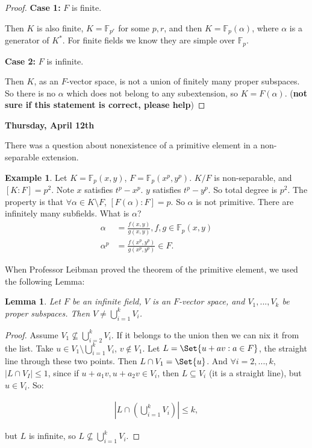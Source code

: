 \documentclass[9pt,reqno,twoside]{amsbook}
\theoremstyle{plain}
\numberwithin{section}{chapter}
\numberwithin{equation}{chapter}
\newtheorem{lem}[theorem]{Lemma}
\theoremstyle{definition}
\newtheorem{Ex}[theorem]{Example}
\theoremstyle{remark}
\theoremstyle{plain}
\newcommand{\sub}{\subseteq}
\newcommand{\F}{\mathbb{F}}
\newcommand{\bb}{\vspace{3mm}}
\newcommand{\bee}{\begin{equation}\begin{aligned}}
\newcommand{\eee}{\end{aligned}\end{equation}}
\newcommand{\fracc}{\frac}
\newcommand{\lpar}{\left(}
\newcommand{\rpar}{\right)}
\renewcommand{\leq}{\leqslant}
\begin{document}
 \begin{proof}
 \textbf{Case 1: }$F$ is finite.
 
 \bb
 Then $K$ is also finite, $K = \F_{p^r}$ for some $p,r$, and then $K = \F_p(\alpha)$, where $\alpha$ is a generator of $K^*$. For finite fields we know they are simple over $\F_p$. 
 
 \bb
 
 \textbf{Case 2: }$F$ is infinite. 
 
 \bb
 
 Then $K$, as an $F$-vector space, is not a union of finitely many proper subspaces. So there is no $\alpha$ which does not belong to any subextension, so $K = F(\alpha)$. (\textbf{not sure if this statement is correct, please help})
 \end{proof}
 
 
 \textbf{Thursday, April 12th}
 
 
 There was a question about nonexistence of a primitive element in a non-separable extension. 
 
 \begin{Ex}
 Let $K = \F_p(x,y)$, $F = \F_p(x^p,y^p)$. $K/F$ is non-separable, and $[K:F] = p^2$. Note $x$ satisfies $t^p - x^p$. $y$ satisfies $t^p - y^p$. So total degree is $p^2$. The property is that $\forall \alpha \in K\setminus F$, $[F(\alpha):F] = p$. So $\alpha$ is not primitive. There are infinitely many subfields. What is $\alpha$? 
 \bee
 \alpha &= \fracc{f(x,y)}{g(x,y)}, f,g \in \F_p(x,y)\\
 \alpha^p &= \fracc{f(x^p,y^p)}{g(x^p,y^p)} \in F.
 \eee
 \end{Ex}
 
 When Professor Leibman proved the theorem of the primitive element, we used the following Lemma:
 \begin{lem}
 Let $F$ be an infinite field, $V$ is an $F$-vector space, and $V_1,...,V_k$ be proper subspaces. Then $V \neq \bigcup_{i = 1}^k V_i$. 
 \end{lem}
 
 \begin{proof}
 Assume $V_1 \nsubseteq \bigcup_{i = 2}^k V_i$. If it belongs to the union then we can nix it from the list. Take $u \in V_1\setminus \bigcup_{i = 1}^k V_i$, $v \notin V_1$. Let $L = \Set{u + av:a \in F}$, the straight line through  these two points. Then $L \cap V_1 = \Set{u}$. And $\forall i = 2,...,k$, $|L\cap V_I| \leq 1$, since if $u + a_1v,u + a_2v \in V_i$, then $L \sub V_i$ (it is a straight line), but $u \in V_i$. So:
 
 \bee
 \left|L \cap \lpar \bigcup_{i = 1}^k V_i \rpar  \right| \leq k,
 \eee
 
 but $L$ is infinite, so $L \nsubseteq \bigcup_{i = 1}^k V_i$. 
 \end{proof}
 
\end{document}
